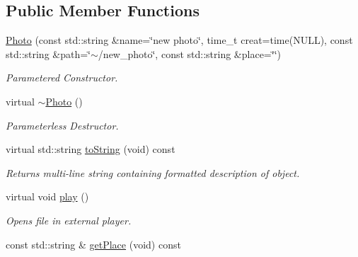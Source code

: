 \subsection*{Public Member Functions}
\begin{DoxyCompactItemize}
\item 
\hypertarget{classPhoto_ab07e00487a31f231f4730b3859664da5}{\hyperlink{classPhoto_ab07e00487a31f231f4730b3859664da5}{Photo} (const std\+::string \&name=\char`\"{}new photo\char`\"{}, time\+\_\+t creat=time(N\+U\+L\+L), const std\+::string \&path=\char`\"{}$\sim$/new\+\_\+photo\char`\"{}, const std\+::string \&place=\char`\"{}\char`\"{})}\label{classPhoto_ab07e00487a31f231f4730b3859664da5}

\begin{DoxyCompactList}\small\item\em Parametered Constructor. \end{DoxyCompactList}\item 
virtual \hyperlink{classPhoto_adc366234be6226600360c7cbba8e7fcf}{$\sim$\+Photo} ()
\begin{DoxyCompactList}\small\item\em Parameterless Destructor. \end{DoxyCompactList}\item 
\hypertarget{classPhoto_a8be4be2bb68b6db13ec45ff3bed71481}{virtual std\+::string \hyperlink{classPhoto_a8be4be2bb68b6db13ec45ff3bed71481}{to\+String} (void) const }\label{classPhoto_a8be4be2bb68b6db13ec45ff3bed71481}

\begin{DoxyCompactList}\small\item\em Returns multi-\/line string containing formatted description of object. \end{DoxyCompactList}\item 
\hypertarget{classPhoto_a145e0540284cbc678ef5bdb02a8fcaa8}{virtual void \hyperlink{classPhoto_a145e0540284cbc678ef5bdb02a8fcaa8}{play} ()}\label{classPhoto_a145e0540284cbc678ef5bdb02a8fcaa8}

\begin{DoxyCompactList}\small\item\em Opens file in external player. \end{DoxyCompactList}\item 
\hypertarget{classPhoto_a310123a0d107ab078bc83a80b484e2c1}{const std\+::string \& \hyperlink{classPhoto_a310123a0d107ab078bc83a80b484e2c1}{get\+Place} (void) const }\label{classPhoto_a310123a0d107ab078bc83a80b484e2c1}


\end{DoxyCompactItemize}

